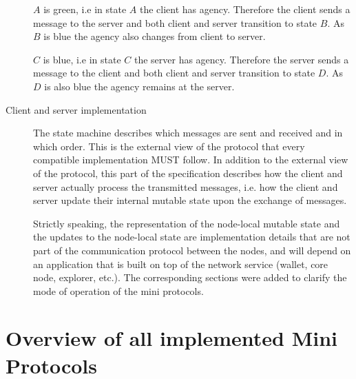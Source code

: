 \begin{description}
      $A$ is green, i.e in state $A$ the client has agency.
      Therefore the client sends a message to the server and
      both client and server transition to state $B$.
      As $B$ is blue the agency also changes from client to server.


      $C$ is blue, i.e in state $C$ the server has agency.
      Therefore the server sends a message to the client and
      both client and server transition to state $D$.
      As $D$ is also blue the agency remains at the server.

\item[Client and server implementation]
  The state machine describes which messages are sent and received and in which order.
  This is the external view of the protocol that every compatible implementation MUST follow.
  In addition to the external view of the protocol, this part of the specification describes
  how the client and server actually process the transmitted messages,
  i.e. how the client and server update their internal mutable state
  upon the exchange of messages.

  Strictly speaking, the representation of the node-local mutable state
  and the updates to the node-local state are implementation details that are
  not part of the communication protocol between the nodes,  and will
  depend on an application that is built on top of the network service
  (wallet, core node, explorer, etc.).
  The corresponding sections were added to clarify the mode of operation of the
  mini protocols.

\end{description}
\section{Overview of all implemented Mini Protocols}

\newcommand{\miniEntry}[5]{
  \begin{framed}
      \noindent\textbf{#1}\hfill  Section \ref{#2}
      \newline {#3}
      \newline {\href{#5}{\small\texttt{#4}}}
  \end{framed}
}

